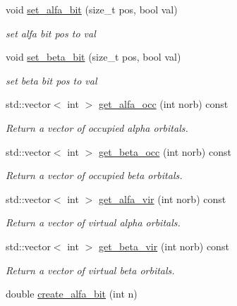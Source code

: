 \begin{DoxyCompactItemize}
void \mbox{\hyperlink{classforte_1_1_determinant_impl_aed8c6eaece3cce82a5acf459013b7b23}{set\+\_\+alfa\+\_\+bit}} (size\+\_\+t pos, bool val)
\begin{DoxyCompactList}\small\item\em set alfa bit pos to val \end{DoxyCompactList}\item 
void \mbox{\hyperlink{classforte_1_1_determinant_impl_a47f0329c3d05f3aa9785b8bb0b2a55a5}{set\+\_\+beta\+\_\+bit}} (size\+\_\+t pos, bool val)
\begin{DoxyCompactList}\small\item\em set beta bit pos to val \end{DoxyCompactList}\item 
std\+::vector$<$ int $>$ \mbox{\hyperlink{classforte_1_1_determinant_impl_afb3ba3c94638a83e137e5ee275bc7001}{get\+\_\+alfa\+\_\+occ}} (int norb) const
\begin{DoxyCompactList}\small\item\em Return a vector of occupied alpha orbitals. \end{DoxyCompactList}\item 
std\+::vector$<$ int $>$ \mbox{\hyperlink{classforte_1_1_determinant_impl_ab87b65035dc9cd5c48d9fc709702e8c8}{get\+\_\+beta\+\_\+occ}} (int norb) const
\begin{DoxyCompactList}\small\item\em Return a vector of occupied beta orbitals. \end{DoxyCompactList}\item 
std\+::vector$<$ int $>$ \mbox{\hyperlink{classforte_1_1_determinant_impl_a1dc3bb02e9944e3c83d98052c91fe44c}{get\+\_\+alfa\+\_\+vir}} (int norb) const
\begin{DoxyCompactList}\small\item\em Return a vector of virtual alpha orbitals. \end{DoxyCompactList}\item 
std\+::vector$<$ int $>$ \mbox{\hyperlink{classforte_1_1_determinant_impl_aabfa5748bf819c5030245fd13dc6115d}{get\+\_\+beta\+\_\+vir}} (int norb) const
\begin{DoxyCompactList}\small\item\em Return a vector of virtual beta orbitals. \end{DoxyCompactList}\item 
double \mbox{\hyperlink{classforte_1_1_determinant_impl_af04a9600e0092df7024fed3a1aa4e5a4}{create\+\_\+alfa\+\_\+bit}} (int n)
\item 

\end{DoxyCompactItemize}

